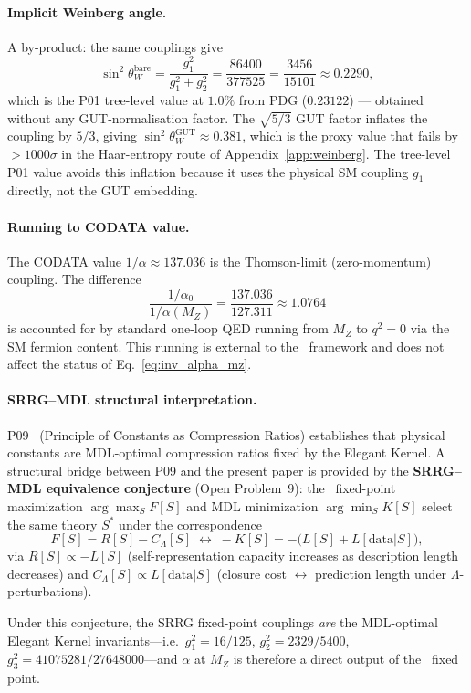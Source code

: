 \documentclass[11pt]{article}
\theoremstyle{remark}
\newcommand{\SRRG}{\text{SRRG}}
\newcommand{\Sstar}{S^*}
\begin{document}
\begin{appendices}
\paragraph{Implicit Weinberg angle.}
A by-product: the same couplings give
\[
  \sin^2\theta_W^{\mathrm{bare}} = \frac{g_1^2}{g_1^2+g_2^2}
  = \frac{86400}{377525} = \frac{3456}{15101} \approx 0.2290,
\]
which is the P01 tree-level value at $1.0\%$ from PDG ($0.23122$) --- obtained
without any GUT-normalisation factor.  The $\sqrt{5/3}$ GUT factor inflates the
coupling by $5/3$, giving $\sin^2\theta_W^{\mathrm{GUT}} \approx 0.381$, which is
the proxy value that fails by $>1000\sigma$ in the Haar-entropy route of
Appendix~\ref{app:weinberg}.  The tree-level P01 value avoids this inflation
because it uses the physical SM coupling $g_1$ directly, not the GUT embedding.

\paragraph{Running to CODATA value.}
The CODATA value $1/\alpha \approx 137.036$ is the Thomson-limit (zero-momentum)
coupling.  The difference
\[
  \frac{1/\alpha_0}{1/\alpha(M_Z)}
  = \frac{137.036}{127.311} \approx 1.0764
\]
is accounted for by standard one-loop QED running from $M_Z$ to $q^2 = 0$ via the
SM fermion content.  This running is external to the \SRRG\ framework and does not
affect the status of Eq.~\eqref{eq:inv_alpha_mz}.

\paragraph{SRRG--MDL structural interpretation.}
P09~\cite{Spivack2025_ArchitectureComputableUniverse} (Principle of Constants as Compression Ratios)
establishes that physical constants are MDL-optimal compression ratios fixed by the
Elegant Kernel.  A structural bridge between P09 and the present paper
is provided by the \textbf{SRRG--MDL equivalence conjecture} (Open Problem~9): the
\SRRG\ fixed-point maximization $\arg\max_S F[S]$ and MDL minimization
$\arg\min_S K[S]$ select the same theory $\Sstar$ under the correspondence
\[
  F[S] = R[S] - C_\Lambda[S]
  \;\longleftrightarrow\;
  -K[S] = -\bigl(L[S]+L[\text{data}|S]\bigr),
\]
via $R[S] \propto -L[S]$ (self-representation capacity increases as description
length decreases) and $C_\Lambda[S] \propto L[\text{data}|S]$ (closure cost
$\leftrightarrow$ prediction length under $\Lambda$-perturbations).

Under this conjecture, the SRRG fixed-point couplings \emph{are} the MDL-optimal
Elegant Kernel invariants---i.e.\ $g_1^2 = 16/125$, $g_2^2 = 2329/5400$,
$g_3^2 = 41075281/27648000$---and $\alpha$ at $M_Z$ is therefore a direct
output of the \SRRG\ fixed point.


\end{appendices}
\end{document}
